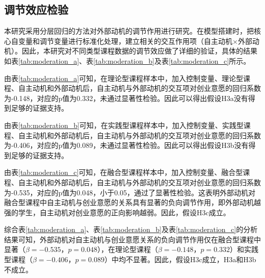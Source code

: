 \subsection{调节效应检验}

本研究采用分层回归的方法对外部动机的调节作用进行研究。在模型搭建时，把核心自变量和调节变量进行标准化处理，建立相关的交互作用项\nolinebreak[3]（自主动机$\times$外部动机）。因此，本研究对不同类型课程数据的调节效应做了详细的验证，具体的结果如表\ref{tab:moderation_a}、表\ref{tab:moderation_b}及表\ref{tab:moderation_c}所示。

由表\ref{tab:moderation_a}可知，在理论型课程样本中，加入控制变量、理论型课程、自主动机和外部动机后，自主动机与外部动机的交互项对创业意愿的回归系数为-0.148，对应的p值为0.332，未通过显著性检验。因此可以得出假设H3a没有得到足够的证据支持。

由表\ref{tab:moderation_b}可知，在实践型课程样本中，加入控制变量、实践型课程、自主动机和外部动机后，自主动机与外部动机的交互项对创业意愿的回归系数为-0.406，对应的p值为0.089，未通过显著性检验。因此可以得出假设H3b没有得到足够的证据支持。

由表\ref{tab:moderation_c}可知，在融合型课程样本中，加入控制变量、融合型课程、自主动机和外部动机后，自主动机与外部动机的交互项对创业意愿的回归系数为-0.535，对应的p值为0.048，小于0.05，通过了显著性检验。这表明外部动机对融合型课程中自主动机与创业意愿的关系具有显著的负向调节作用，即外部动机越强的学生，自主动机对创业意愿的正向影响越弱。因此，假设H3c成立。

综合表\ref{tab:moderation_a}、表\ref{tab:moderation_b}及表\ref{tab:moderation_c}的分析结果可知，外部动机对自主动机与创业意愿关系的负向调节作用仅在融合型课程中显著\nolinebreak[3]（$\beta=-0.535$，$p=0.048$），在理论型课程\nolinebreak[3]（$\beta=-0.148$，$p=0.332$）和实践型课程\nolinebreak[3]（$\beta=-0.406$，$p=0.089$）中均不显著。因此，假设H3c成立，H3a和H3b不成立。

